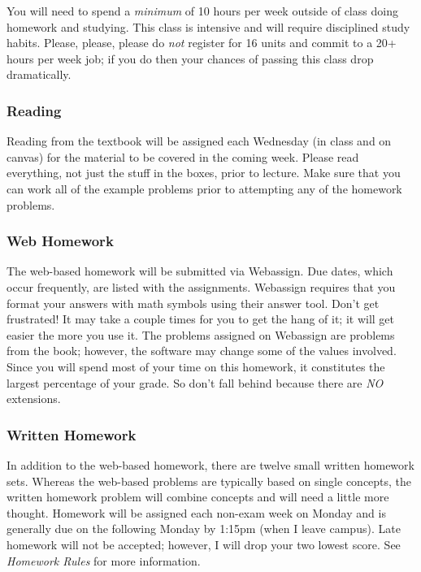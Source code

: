 \documentclass[letterpaper,12pt,fleqn]{article}
\begin{document}
You will need to spend a \emph{minimum} of 10 hours per week outside of class doing homework and studying. This
class is intensive and will require disciplined study habits.  Please, please, please do \emph{not} register for 16
units and commit to a 20+ hours per week job; if you do then your chances of passing this class drop dramatically.

\subsubsection*{Reading}

Reading from the textbook will be assigned each Wednesday (in class and on canvas) for the material to be covered in
the coming week.  Please read everything, not just the stuff in the boxes, prior to lecture.  Make sure that you
can work all of the example problems prior to attempting any of the homework problems.

\subsubsection*{Web Homework}

The web-based homework will be submitted via Webassign.  Due dates, which occur frequently, are listed with the
assignments.  Webassign requires that you format your answers with math symbols using their answer tool.  Don't get
frustrated!  It may take a couple times for you to get the hang of it; it will get easier the more you use it.  The
problems assigned on Webassign are problems from the book; however, the software may change some of the values
involved.  Since you will spend most of your time on this homework, it constitutes the largest percentage of your
grade.  So don't fall behind because there are \emph{NO} extensions.

\subsubsection*{Written Homework}

In addition to the web-based homework, there are twelve small written homework sets.  Whereas the web-based
problems are typically based on single concepts, the written homework problem will combine concepts and will need a
little more thought.  Homework will be assigned each non-exam week on Monday and is generally due on the following
Monday by 1:15pm (when I leave campus).  Late homework will not be accepted; however, I will drop your two lowest
score.  See \emph{Homework Rules} for more information.
\end{document}

